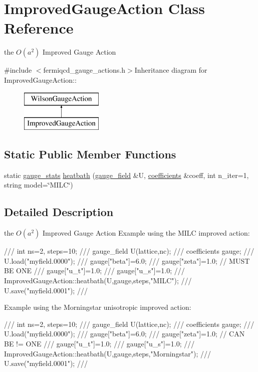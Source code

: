 \hypertarget{class_improved_gauge_action}{
\section{ImprovedGaugeAction Class Reference}
\label{class_improved_gauge_action}
}


the $ O(a^2)$ Improved Gauge Action  


{\ttfamily \#include $<$fermiqcd\_\-gauge\_\-actions.h$>$}Inheritance diagram for ImprovedGaugeAction::\begin{figure}[H]
\begin{center}
\leavevmode
\includegraphics[height=2cm]{class_improved_gauge_action}
\end{center}
\end{figure}
\subsection*{Static Public Member Functions}
\begin{DoxyCompactItemize}
\item 
static \hyperlink{classgauge__stats}{gauge\_\-stats} \hyperlink{class_improved_gauge_action_a02e55d57665313eb939b9b6e77697680}{heatbath} (\hyperlink{classgauge__field}{gauge\_\-field} \&U, \hyperlink{classcoefficients}{coefficients} \&coeff, int n\_\-iter=1, string model=\char`\"{}MILC\char`\"{})
\end{DoxyCompactItemize}


\subsection{Detailed Description}
the $ O(a^2)$ Improved Gauge Action Example using the MILC improved action: \begin{DoxyVerb}
///    int ns=2, steps=10;
///    gauge_field U(lattice,nc);
///    coefficients gauge;
///    U.load("myfield.0000");
///    gauge["beta"]=6.0;
///    gauge["zeta"]=1.0; // MUST BE ONE
///    gauge["u_t"]=1.0;
///    gauge["u_s"]=1.0;
///    ImprovedGaugeAction::heatbath(U,gauge,steps,"MILC");
///    U.save("myfield.0001");
/// \end{DoxyVerb}
 Example using the Morningstar unisotropic improved action: \begin{DoxyVerb}
///    int ns=2, steps=10;
///    gauge_field U(lattice,nc);
///    coefficients gauge;
///    U.load("myfield.0000");
///    gauge["beta"]=6.0;
///    gauge["zeta"]=1.0; // CAN BE != ONE
///    gauge["u_t"]=1.0;
///    gauge["u_s"]=1.0;
///    ImprovedGaugeAction::heatbath(U,gauge,steps,"Morningstar");
///    U.save("myfield.0001");
/// \end{DoxyVerb}
 

